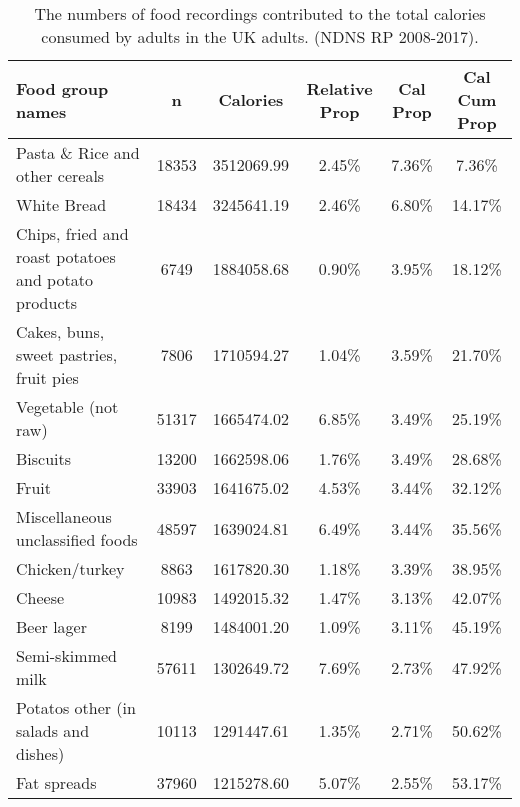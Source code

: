 \documentclass{bmcart}
\begin{document}
\begin{backmatter}
\begin{table}[h!]
	\caption{The numbers of food recordings contributed to the total calories consumed by adults in the UK adults. (NDNS RP 2008-2017).}
	\begin{tabular}{lccccc}
		Food group names                                    & n     & Calories   & Relative Prop & Cal Prop & Cal Cum Prop \\\hline
		Pasta \& Rice and other cereals                     & 18353 & 3512069.99 & 2.45\%        & 7.36\%   & 7.36\%       \\
		White Bread                                         & 18434 & 3245641.19 & 2.46\%        & 6.80\%   & 14.17\%      \\
		Chips, fried and roast potatoes and potato products & 6749  & 1884058.68 & 0.90\%        & 3.95\%   & 18.12\%      \\
		Cakes, buns, sweet pastries, fruit pies             & 7806  & 1710594.27 & 1.04\%        & 3.59\%   & 21.70\%      \\
		Vegetable (not raw)                                 & 51317 & 1665474.02 & 6.85\%        & 3.49\%   & 25.19\%      \\
		Biscuits                                            & 13200 & 1662598.06 & 1.76\%        & 3.49\%   & 28.68\%      \\
		Fruit                                               & 33903 & 1641675.02 & 4.53\%        & 3.44\%   & 32.12\%      \\
		Miscellaneous unclassified foods                    & 48597 & 1639024.81 & 6.49\%        & 3.44\%   & 35.56\%      \\
		Chicken/turkey                                      & 8863  & 1617820.30 & 1.18\%        & 3.39\%   & 38.95\%      \\
		Cheese                                              & 10983 & 1492015.32 & 1.47\%        & 3.13\%   & 42.07\%      \\
		Beer lager                                          & 8199  & 1484001.20 & 1.09\%        & 3.11\%   & 45.19\%      \\
		Semi-skimmed milk                                   & 57611 & 1302649.72 & 7.69\%        & 2.73\%   & 47.92\%      \\
		Potatos other (in salads and dishes)                & 10113 & 1291447.61 & 1.35\%        & 2.71\%   & 50.62\%      \\
		Fat spreads                                         & 37960 & 1215278.60 & 5.07\%        & 2.55\%   & 53.17\%      \\

\end{tabular}
\end{table}
\end{backmatter}
\end{document}
